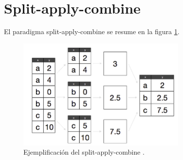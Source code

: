 \documentclass[]{article}
\newenvironment{Shaded}{\begin{snugshade}}{\end{snugshade}}
\newcommand{\KeywordTok}[1]{\textcolor[rgb]{0.13,0.29,0.53}{\textbf{{#1}}}}
\newcommand{\DecValTok}[1]{\textcolor[rgb]{0.00,0.00,0.81}{{#1}}}
\newcommand{\FloatTok}[1]{\textcolor[rgb]{0.00,0.00,0.81}{{#1}}}
\newcommand{\StringTok}[1]{\textcolor[rgb]{0.31,0.60,0.02}{{#1}}}
\newcommand{\NormalTok}[1]{{#1}}
\begin{document}
\begin{Shaded}
\end{Shaded}

\section{Split-apply-combine}\label{split-apply-combine}

El paradigma split-apply-combine se resume en la figura \ref{fig:sac}.

\begin{figure}[h]
    \centering
    \includegraphics[width=0.75\textwidth]{../img/01_s-a-c.png}
    \caption{Ejemplificación del split-apply-combine \textcite[Split-Apply-Combine]{vaidyanathan2014r}.}
    \label{fig:sac}
\end{figure}
\end{document}
